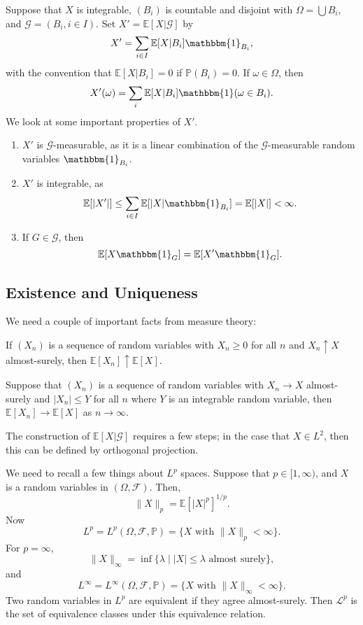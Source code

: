 \documentclass[12pt]{article}
\begin{document}
Suppose that $X$ is integrable, $(B_i)$ is countable and disjoint with $\Omega = \bigcup B_i$, and $\mathcal{G} = (B_i, i \in I)$. Set $X' = \mathbb{E}[X | \mathcal{G}]$ by
\[
X' = \sum_{i \in I} \mathbb{E}[X | B_i ] \mathbbm{1}_{B_i},
\]
with the convention that $\mathbb{E}[X | B_i] = 0$ if $\mathbb{P}(B_i) = 0$. If $\omega \in \Omega$, then
\[
X'(\omega) = \sum_i \mathbb{E}[X | B_i] \mathbbm{1}(\omega \in B_i).
\]
We look at some important properties of $X'$.
\begin{enumerate}
	\item $X'$ is $\mathcal{G}$-measurable, as it is a linear combination of the $\mathcal{G}$-measurable random variables $\mathbbm{1}_{B_i}$.
	\item $X'$ is integrable, as
		\[
		\mathbb{E}[|X'|] \leq \sum_{i \in I} \mathbb{E}[|X| \mathbbm{1}_{B_i}] = \mathbb{E}[|X|] < \infty.
		\]
	\item If $G \in \mathcal{G}$, then
		\[
		\mathbb{E}[X \mathbbm{1}_{G}] = \mathbb{E}[X' \mathbbm{1}_{G}].
		\]
\end{enumerate}

\subsection{Existence and Uniqueness}%
\label{sub:e_u}

We need a couple of important facts from measure theory:

\begin{theorem}
	If $(X_n)$ is a sequence of random variables with $X_n \geq 0$ for all $n$ and $X_n \uparrow X$ almost-surely, then $\mathbb{E}[X_n] \uparrow \mathbb{E}[X]$.
\end{theorem}

\begin{theorem}
	Suppose that $(X_n)$ is a sequence of random variables with $X_n \to X$ almost-surely and $|X_n| \leq Y$ for all $n$ where $Y$ is an integrable random variable, then $\mathbb{E}[X_n] \to \mathbb{E}[X]$ as $n \to \infty$.
\end{theorem}

The construction of $\mathbb{E}[X | \mathcal{G}]$ requires a few steps; in the case that $X \in L^2$, then this can be defined by orthogonal projection.

We need to recall a few things about $L^p$ spaces. Suppose that $p \in [1, \infty)$, and $X$ is a random variables in $(\Omega, \mathcal{F})$. Then,
\[
\|X\|_p = \mathbb{E}[|X|^p]^{1/p}.
\]
Now
\[
	L^p = L^p(\Omega, \mathcal{F}, \mathbb{P}) = \{X \text{ with } \|X\|_p < \infty\}.
\]
For $p = \infty$,
\[
	\|X\|_\infty = \inf\{ \lambda \mid |X| \leq \lambda \text{ almost surely}\},
\]
and
\[
	L^\infty = L^\infty(\Omega, \mathcal{F}, \mathbb{P}) = \{X \text{ with } \|X\|_\infty < \infty\}.
\]
Two random variables in $L^p$ are equivalent if they agree almost-surely. Then $\mathcal{L}^p$ is the set of equivalence classes under this equivalence relation.
\end{document}
